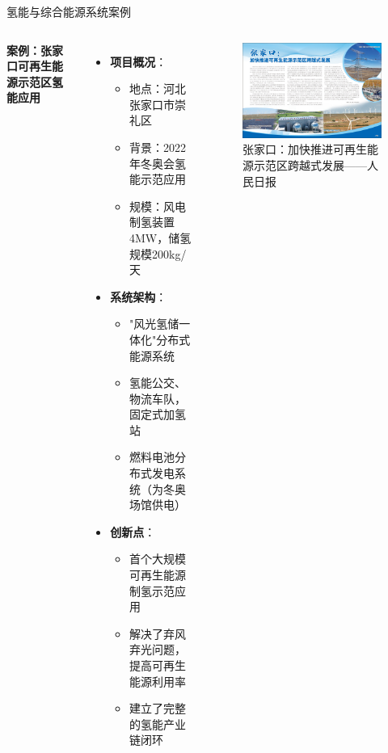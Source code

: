 \documentclass[aspectratio=169]{beamer}
\begin{document}
\begin{frame}{氢能与综合能源系统案例}
  \begin{columns}
    \textbf{案例：张家口可再生能源示范区氢能应用}
    \begin{itemize}
      \item \textbf{项目概况}：
        \begin{itemize}
          \item 地点：河北张家口市崇礼区
          \item 背景：2022年冬奥会氢能示范应用
          \item 规模：风电制氢装置4MW，储氢规模200kg/天\cite{Wu2023}
        \end{itemize}
      \item \textbf{系统架构}：
        \begin{itemize}
          \item "风光氢储一体化"分布式能源系统
          \item 氢能公交、物流车队，固定式加氢站
          \item 燃料电池分布式发电系统（为冬奥场馆供电）
        \end{itemize}
      \item \textbf{创新点}：
        \begin{itemize}
          \item 首个大规模可再生能源制氢示范应用
          \item 解决了弃风弃光问题，提高可再生能源利用率
          \item 建立了完整的氢能产业链闭环
        \end{itemize}
    \end{itemize}
    \begin{figure}
      \centering
      \caption{张家口：加快推进可再生能源示范区跨越式发展——人民日报}
      \includegraphics[width=\textwidth]{fig/张家口：加快推进可再生能源示范区跨越式发展.jpg}
    \end{figure}
  \end{columns}
\end{frame}
\end{document}
